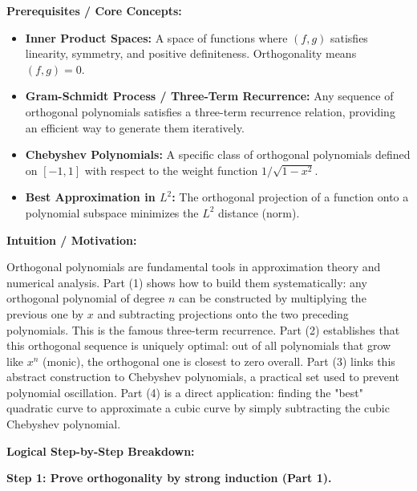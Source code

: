 \begin{solution}
\textbf{Prerequisites / Core Concepts:}
\begin{itemize}
    \item \textbf{Inner Product Spaces:} A space of functions where $(f, g)$ satisfies linearity, symmetry, and positive definiteness. Orthogonality means $(f, g) = 0$.
    \item \textbf{Gram-Schmidt Process / Three-Term Recurrence:} Any sequence of orthogonal polynomials satisfies a three-term recurrence relation, providing an efficient way to generate them iteratively.
    \item \textbf{Chebyshev Polynomials:} A specific class of orthogonal polynomials defined on $[-1,1]$ with respect to the weight function $1/\sqrt{1-x^2}$.
    \item \textbf{Best Approximation in $L^2$:} The orthogonal projection of a function onto a polynomial subspace minimizes the $L^2$ distance (norm).
\end{itemize}

\textbf{Intuition / Motivation:}

Orthogonal polynomials are fundamental tools in approximation theory and numerical analysis. Part (1) shows how to build them systematically: any orthogonal polynomial of degree $n$ can be constructed by multiplying the previous one by $x$ and subtracting projections onto the two preceding polynomials. This is the famous three-term recurrence.
Part (2) establishes that this orthogonal sequence is uniquely optimal: out of all polynomials that grow like $x^n$ (monic), the orthogonal one is closest to zero overall. 
Part (3) links this abstract construction to Chebyshev polynomials, a practical set used to prevent polynomial oscillation. 
Part (4) is a direct application: finding the "best" quadratic curve to approximate a cubic curve by simply subtracting the cubic Chebyshev polynomial.

\textbf{Logical Step-by-Step Breakdown:}

\textbf{Step 1: Prove orthogonality by strong induction (Part 1).}


\end{solution}
